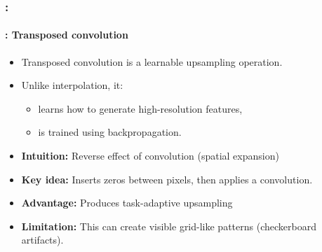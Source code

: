 \documentclass[xcolor=table]{beamer}
\begin{document}
\begin{frame}
	\frametitle{\insertshortsubtitle: \insertsection}
	\framesubtitle{\insertsubsection: Transposed convolution}
	
	\begin{itemize}
		
		\item Transposed convolution is a learnable upsampling operation.
		
		\item Unlike interpolation, it:
		\begin{itemize}
			\item learns how to generate high-resolution features,
			\item is trained using backpropagation.
		\end{itemize}
		
		\item \textbf{Intuition:} Reverse effect of convolution (spatial expansion)
		
		\item \textbf{Key idea:} Inserts zeros between pixels, then applies a convolution.
		
		\item \textbf{Advantage:} Produces task-adaptive upsampling
		
		\item \textbf{Limitation:} This can create visible grid-like patterns (checkerboard artifacts).
		
	\end{itemize}
	
\end{frame}
\end{document}
